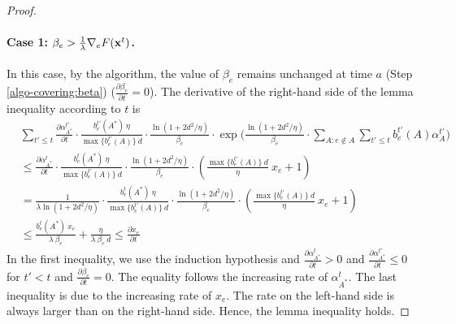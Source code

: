 \begin{proof}
\paragraph{Case 1: $\beta_{e} > \frac{1}{\lambda} \nabla_{e} F(\mathbf{x}^{t})$.}
In this case, by the algorithm, the value of $\beta_{e}$ remains unchanged at time $a$ (Step \ref{algo-covering:beta}) ($\frac{\partial \beta_{e}}{\partial t} = 0$).
The derivative of the right-hand side of the lemma inequality according to $t$ is
\begin{align*}
&\sum_{t' \le t} \frac{\partial \alpha^{t'}_{A^{*}}}{\partial t} \cdot
	\frac{b^{t'}_{e}(A^{*}) \ \eta }{\max \{b^{t'}_{e}(A)\} \ d} \cdot \frac{\ln(1+2d^{2}/\eta)}{\beta_{e}}
		\cdot \exp\biggl( \frac{\ln(1+2d^{2}/\eta)}{\beta_{e} } \cdot \sum_{A: e \notin A} \sum_{t' \le t} b^{t'}_{e}(A) \alpha^{t'}_{A} \biggr) \\
%
&\leq \frac{\partial \alpha^{t}_{A^{*}}}{\partial t} \cdot
	\frac{b^{t}_{e}(A^{*}) \ \eta }{\max \{b^{t'}_{e}(A)\} \ d} \cdot \frac{\ln(1+2d^{2}/\eta)}{\beta_{e}} \cdot \left( \frac{\max \{b^{t'}_{e}(A)\} \ d}{\eta}\ x_{e} + 1 \right) \\
%
&= \frac{1}{\lambda \ln(1+2d^{2}/\eta)} \cdot
	\frac{b^{t}_{e}(A^{*}) \ \eta }{\max \{b^{t'}_{e}(A)\} \ d} \cdot \frac{\ln(1+2d^{2}/\eta)}{\beta_{e}} \cdot \left( \frac{\max \{b^{t'}_{e}(A)\} \ d}{\eta}\ x_{e} + 1 \right) \\
%
&\leq  \frac{b^{t}_{e}(A^{*}) \ x_{e}}{\lambda\ \beta_{e}} + \frac{\eta}{\lambda\ \beta_{e}\ d}
\leq \frac{\partial x_{e}}{\partial t}
\end{align*}
%
In the first inequality, we use the induction hypothesis and $\frac{\partial \alpha^{t}_{A^{*}}}{\partial t} > 0$
and $\frac{\partial \alpha^{t'}_{A^{*}}}{\partial t} \leq 0$ for $t' < t$ and $\frac{\partial \beta_{e}}{\partial t} = 0$.
The equality follows the increasing rate of $\alpha^{t}_{A^{*}}$.
The last inequality is due to the increasing rate of $x_{e}$.
The rate on the left-hand side is always larger than on the right-hand side. Hence, the lemma inequality holds.


\end{proof}
